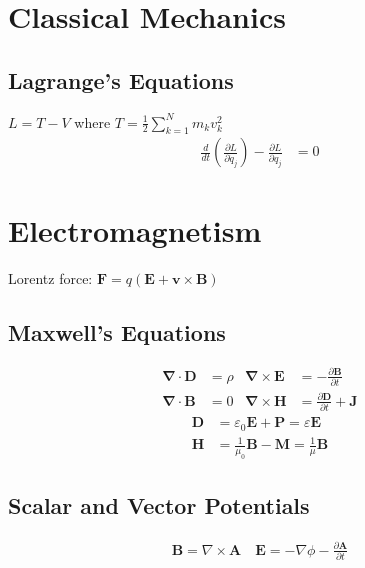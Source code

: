 \documentclass[10pt,twocolumn]{article}
\newcommand{\sigaussian}[2]{#1} %
\newcommand{\D}{\mathbf{\nabla}}
\newcommand{\A}{\mathbf{A}}
\newcommand{\B}{\mathbf{B}}
\newcommand{\E}{\mathbf{E}}
\begin{document}
  \section{Classical Mechanics}
  \subsection*{Lagrange's Equations}
  $L=T-V$ where $T=\frac{1}{2}\sum_{k=1}^Nm_kv_k^2$
  \begin{align*}
  \frac{d}{dt}\left(\frac{\partial L}{\partial\dot{q}_j}\right)-\frac{\partial L}{\partial q_j} &=0
  \end{align*}

  \section{Electromagnetism}
  Lorentz force: $\mathbf{F} = q(\mathbf{E}+\mathbf{v}\times\mathbf{B})$
  \subsection*{Maxwell's Equations}
  \begin{align*}
    \D\cdot\mathbf{D} &= \sigaussian{}{4\pi}\rho &
    \D\times\E &= -\sigaussian{}{\frac1c}\frac{\partial\B}{\partial t} \\
    \D\cdot\B &= 0
    & \D\times\mathbf{H} &=
    \sigaussian{}{\frac1c}\frac{\partial \mathbf{D}}{\partial t}
    + \sigaussian{}{\frac{4\pi}c}\mathbf{J}
  \end{align*}
  \begin{align*}
  \mathbf{D} &= \varepsilon_0\E+\mathbf{P}=\varepsilon\E \\
  \mathbf{H} &= \frac{1}{\mu_0}\mathbf{B} - \mathbf{M}=\frac{1}{\mu}\mathbf{B}
  \end{align*}
  \subsection*{Scalar and Vector Potentials}
  \begin{align*}
  \B=\nabla\times\A \quad \E=-\nabla\phi-\frac{\partial \A}{\partial t}
  \end{align*}
\end{document}
